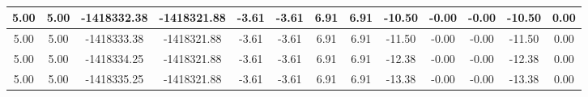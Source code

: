 \begin{table}[htbp]
\begin{adjustbox}{angle=90}
\begin{tabular}{|c|c|c|c|c|c|c|c|c|c|c|c|c|}
 5.00 & 5.00 & -1418332.38 & -1418321.88 & -3.61 & -3.61 & 6.91 & 6.91 & -10.50 & -0.00 & -0.00 & -10.50 & 0.00\\ \hline
 5.00 & 5.00 & -1418333.38 & -1418321.88 & -3.61 & -3.61 & 6.91 & 6.91 & -11.50 & -0.00 & -0.00 & -11.50 & 0.00\\ \hline
 5.00 & 5.00 & -1418334.25 & -1418321.88 & -3.61 & -3.61 & 6.91 & 6.91 & -12.38 & -0.00 & -0.00 & -12.38 & 0.00\\ \hline
 5.00 & 5.00 & -1418335.25 & -1418321.88 & -3.61 & -3.61 & 6.91 & 6.91 & -13.38 & -0.00 & -0.00 & -13.38 & 0.00\\ \hline
            \end{tabular}
        \end{adjustbox}
        \caption{}
        \label{}
    \end{table}
    